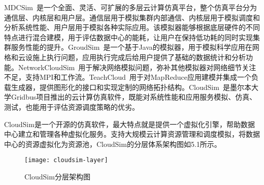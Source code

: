 MDCSim~\cite{Lim2009MDCSim}是一个全面、灵活、可扩展的多层云计算仿真平台，整个仿真平台分为通信层、内核层和用户层。通信层用于模拟集群内部通信、内核层用于模拟调度和分析系统性能、用户层用于模拟各种实际应用。该模拟器能够根据底层硬件的不同特点进行混合建模，用于评估数据中心的能耗，让用户在保持低功耗的同时实现集群服务性能的提升。GroudSim~\cite{Ostermann2011GroudSim}是一个基于Java的模拟器，用于模拟科学应用在网格和云设施上执行问题，应用执行完成后给用户提供了基础的数据统计和分析功能。NetworkCloudSim~\cite{Garg2012NetworkCloudSim}用于解决网络模拟问题，弥补其他模拟器对网络细节关注不足，支持MPI和工作流。TeachCloud~\cite{Jararweh2013TeachCloud}用于对MapReduce应用建模并集成一个负载生成器，提供图形化的接口和实现定制的网络拓扑结构。CloudSim~\cite{Calheiros2009CloudSim}是墨尔本大学Gridbus项目推出的云计算仿真软件，既能对系统性能和应用服务模拟、仿真、测试，也能用于评估资源调度策略的优劣。

CloudSim是一个开源的仿真软件，最大特点就是提供一个虚拟化引擎，帮助数据中心建立和管理各种虚拟化服务。支持大规模云计算资源管理和调度模拟，将数据中心的资源虚拟化为资源池，CloudSim的分层体系架构图如5.1所示。
\begin{figure}[H] %
	\centering
	\texttt{[image: cloudsim-layer]}
	\caption{CloudSim分层架构图}
\end{figure}

